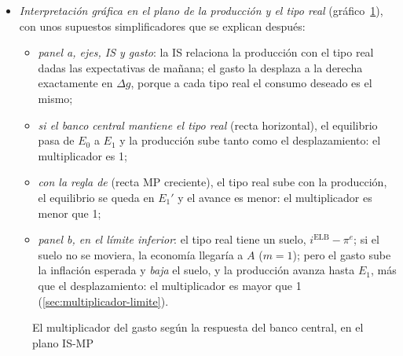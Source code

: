 \documentclass[11pt]{article}
\begin{document}
\begin{itemize}
\item \emph{Interpretación gráfica en el plano de la producción y el tipo real} (gráfico~\ref{fig:multiplicador-respuesta-monetaria}), con unos supuestos simplificadores que se explican después:
  \begin{itemize}
  \item \emph{panel a, ejes, IS y gasto}: la IS relaciona la producción con el tipo real dadas las expectativas de mañana; el gasto la desplaza a la derecha exactamente en $\Delta g$, porque a cada tipo real el consumo deseado es el mismo;
  \item \emph{si el banco central mantiene el tipo real} (recta horizontal), el equilibrio pasa de $E_0$ a $E_1$ y la producción sube tanto como el desplazamiento: el multiplicador es 1;
  \item \emph{con la regla de } (recta MP creciente), el tipo real sube con la producción, el equilibrio se queda en $E_1'$ y el avance es menor: el multiplicador es menor que 1;
  \item \emph{panel b, en el límite inferior}: el tipo real tiene un suelo, $i^{\mathrm{ELB}}-\pi^e$; si el suelo no se moviera, la economía llegaría a $A$ ($m=1$); pero el gasto sube la inflación esperada y \emph{baja} el suelo, y la producción avanza hasta $E_1$, más que el desplazamiento: el multiplicador es mayor que 1 (\ref{sec:multiplicador-limite}).
  \end{itemize}
\end{itemize}

\begin{figure}[H]
\centering
\caption{El multiplicador del gasto según la respuesta del banco central, en el plano IS-MP}\label{fig:multiplicador-respuesta-monetaria}
\end{figure}
\end{document}
